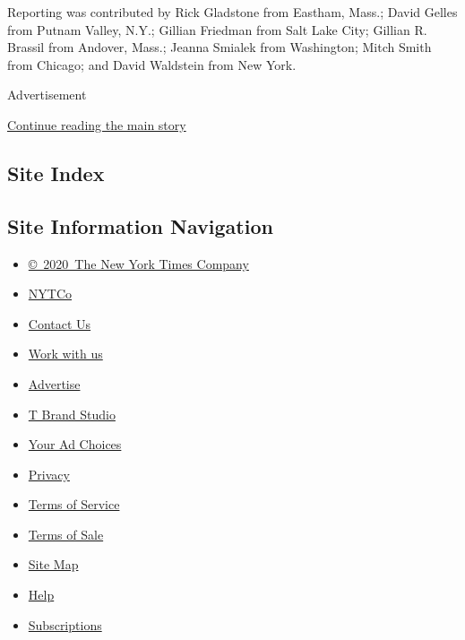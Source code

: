 Reporting was contributed by Rick Gladstone from Eastham, Mass.; David
Gelles from Putnam Valley, N.Y.; Gillian Friedman from Salt Lake City;
Gillian R. Brassil from Andover, Mass.; Jeanna Smialek from Washington;
Mitch Smith from Chicago; and David Waldstein from New York.

Advertisement

\protect\hyperlink{after-bottom}{Continue reading the main story}

\hypertarget{site-index}{%
\subsection{Site Index}\label{site-index}}

\hypertarget{site-information-navigation}{%
\subsection{Site Information
Navigation}\label{site-information-navigation}}

\begin{itemize}
\tightlist
\item
  \href{https://help.nytimes.com/hc/en-us/articles/115014792127-Copyright-notice}{©~2020~The
  New York Times Company}
\end{itemize}

\begin{itemize}
\tightlist
\item
  \href{https://www.nytco.com/}{NYTCo}
\item
  \href{https://help.nytimes.com/hc/en-us/articles/115015385887-Contact-Us}{Contact
  Us}
\item
  \href{https://www.nytco.com/careers/}{Work with us}
\item
  \href{https://nytmediakit.com/}{Advertise}
\item
  \href{http://www.tbrandstudio.com/}{T Brand Studio}
\item
  \href{https://www.nytimes.com/privacy/cookie-policy\#how-do-i-manage-trackers}{Your
  Ad Choices}
\item
  \href{https://www.nytimes.com/privacy}{Privacy}
\item
  \href{https://help.nytimes.com/hc/en-us/articles/115014893428-Terms-of-service}{Terms
  of Service}
\item
  \href{https://help.nytimes.com/hc/en-us/articles/115014893968-Terms-of-sale}{Terms
  of Sale}
\item
  \href{https://spiderbites.nytimes.com}{Site Map}
\item
  \href{https://help.nytimes.com/hc/en-us}{Help}
\item
  \href{https://www.nytimes.com/subscription?campaignId=37WXW}{Subscriptions}
\end{itemize}
